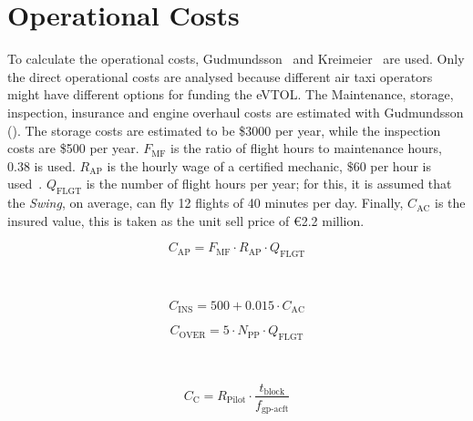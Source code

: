 \section{Operational Costs}
\label{sec:operational_Costs}
To calculate the operational costs, Gudmundsson~\cite{gudmundsson2013general} and Kreimeier~\cite{Kreimeier2018} are used.
Only the direct operational costs are analysed because different air taxi operators might have different options for funding the eVTOL. The Maintenance, storage, inspection, insurance and engine overhaul costs are estimated with Gudmundsson (). The storage costs are estimated to be \$3000 per year, while the inspection costs are \$500 per year. $F_{\text{MF}}$ is the ratio of flight hours to maintenance hours, $0.38$ is used. $R_{\text{AP}}$ is the hourly wage of a certified mechanic, $\$60$ per hour is used~\cite{gudmundsson2013general}. $Q_{\text{FLGT}}$ is the number of flight hours per year; for this, it is assumed that the \textit{Swing}, on average, can fly 12 flights of 40 minutes per day.
Finally, $C_{\text{AC}}$ is the insured value, this is taken as the unit sell price of €2.2 million.

\begin{minipage}{0.45\linewidth}
    \begin{equation}
    \label{eq:cost:oper:Maintenance}
    C_{\text{AP}} = F_{\text{MF}} \cdot R_{\text{AP}} \cdot Q_{\text{FLGT}}
\end{equation}
\end{minipage}
~
\begin{minipage}{0.45\linewidth}
    \begin{equation}
    \label{eq:cost:oper:insurance}
    C_{\text{INS}} = 500 + 0.015 \cdot C_{\text{AC}}
\end{equation}
\end{minipage}

\begin{minipage}{0.45\linewidth}
    \begin{equation}
    \label{eq:cost:oper:Engine_overhaul_fund}
    C_{\text{OVER}} = 5 \cdot N_{\text{PP}} \cdot Q_{\text{FLGT}}
\end{equation}
\end{minipage}
~
\begin{minipage}{0.45\linewidth}
    \begin{equation}
    \label{eq:cost:oper:crew}
    C_{\text{C}} = R_{\text{Pilot}} \cdot \frac{t_{\text{block}}}{f_{\text{gp-acft}}}
\end{equation}
\end{minipage}



